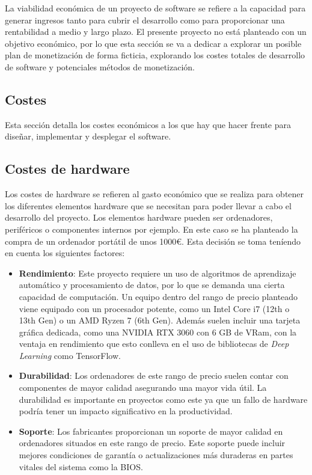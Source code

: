 La viabilidad económica de un proyecto de software se refiere a la capacidad para generar ingresos tanto para cubrir el desarrollo como para proporcionar una rentabilidad a medio y largo plazo. El presente proyecto no está planteado con un objetivo económico, por lo que esta sección se va a dedicar a explorar un posible plan de monetización de forma ficticia, explorando los costes totales de desarrollo de software y potenciales métodos de monetización.

\subsection{Costes}
Esta sección detalla los costes económicos a los que hay que hacer frente para diseñar, implementar y desplegar el software.

\subsection{Costes de hardware}
Los costes de hardware se refieren al gasto económico que se realiza para obtener los diferentes elementos hardware que se necesitan para poder llevar a cabo el desarrollo del proyecto. Los elementos hardware pueden ser ordenadores, periféricos o componentes internos por ejemplo.
En este caso se ha planteado la compra de un ordenador portátil de unos 1000€. Esta decisión se toma teníendo en cuenta los siguientes factores:

\begin{itemize}
\tightlist
\item \textbf{Rendimiento}: Este proyecto requiere un uso de algoritmos de aprendizaje automático y procesamiento de datos, por lo que se demanda una cierta capacidad de computación. 
Un equipo dentro del rango de precio planteado viene equipado con un procesador potente, como un Intel Core i7 (12th o 13th Gen) o un AMD Ryzen 7 (6th Gen). Además suelen incluir una tarjeta gráfica dedicada, como una NVIDIA RTX 3060 con 6 GB de VRam, con la ventaja en rendimiento que esto conlleva en el uso de bibliotecas de \textit{Deep Learning} como TensorFlow.

\item \textbf{Durabilidad}: Los ordenadores de este rango de precio suelen contar con componentes de mayor calidad asegurando una mayor vida útil. La durabilidad es importante en proyectos como este ya que un fallo de hardware podría tener un impacto significativo en la productividad.

\item \textbf{Soporte}: Los fabricantes proporcionan un soporte de mayor calidad en ordenadores situados en este rango de precio. Este soporte puede incluir mejores condiciones de garantía o actualizaciones más duraderas en partes vitales del sistema como la BIOS.
\end{itemize}

